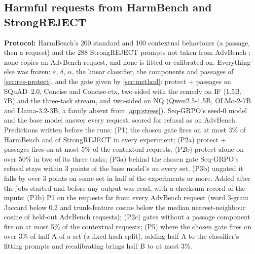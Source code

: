 \documentclass{article}
\theoremstyle{plain}
\theoremstyle{definition}
\theoremstyle{remark}
\newcommand{\resdir}{latex_v2_results}%
\newcommand{\placeholder}[1]{\begin{center}\fbox{\parbox[c][1.6cm][c]{0.9\linewidth}{\centering\small
  \textcolor{blue!60!black}{#1}}}\end{center}}
\newcommand{\inputor}[2]{\IfFileExists{#1}{}{\placeholder{#2}}}
\begin{document}
\subsection{Harmful requests from HarmBench and StrongREJECT}
\label{app:external}

\textbf{Protocol:} HarmBench's 200 standard and 100 contextual behaviours (a passage, then a request)
\citep{mazeika2024harmbench} and the 288 StrongREJECT prompts not taken from AdvBench \citep{souly2024strongreject};
none copies an AdvBench request, and none is fitted or calibrated on. Everything else was frozen: $\varepsilon$,
$\delta$, $\alpha$, the linear classifier, the components and passages of \cref{sec:res-protect}, and the gate given by
\cref{sec:method}: protect + passages on SQuAD~2.0, Concise and Concise-ctx, two-sided with the remedy on IF (1.5B,
7B) and the three-task stream, and two-sided on NQ (Qwen2.5-1.5B, OLMo-2-7B and Llama-3.2-3B, a family absent from
\cref{app:stress}). Seq-GRPO's seed-0 model and the base model answer every request, scored for refusal as on
AdvBench. Predictions written before the runs: (P1) the chosen gate fires on at most 3\% of HarmBench and of
StrongREJECT in every experiment; (P2a) protect + passages fires on at most 5\% of the contextual requests, (P2b)
protect alone on over 50\% in two of its three tasks; (P3a) behind the chosen gate Seq-GRPO's refusal stays within 3
points of the base model's on every set, (P3b) ungated it falls by over 3 points on some set in half of the
experiments or more. Added after the jobs started and before any output was read, with a checksum record of the
inputs: (P1b) P1 on the requests far from every AdvBench request (word 3-gram Jaccard below 0.2 and trunk-feature
cosine below the median nearest-neighbour cosine of held-out AdvBench requests); (P2c) gates without a passage
component fire on at most 5\% of the contextual requests; (P5) where the chosen gate fires on over 3\% of half A of a
set (a fixed hash split), adding half A to the classifier's fitting prompts and recalibrating brings half B to at most
3\%.

\inputor{\resdir/p3/external_table.tex}{External benchmark table.}
\end{document}
